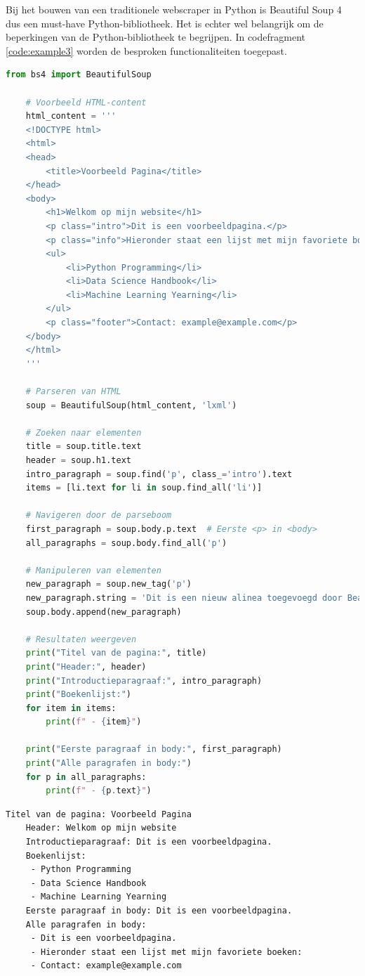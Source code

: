 Bij het bouwen van een traditionele webscraper  in Python is Beautiful Soup 4 dus een must-have Python-bibliotheek. Het is echter wel belangrijk om de beperkingen van de Python-bibliotheek te begrijpen. In codefragment \ref{code:example3} worden de besproken functionaliteiten toegepast.


\begin{lstlisting}[language=python, captionpos=b, caption=Een voorbeeld van de kernfunctionaliteiten van Beautiful Soup 4, label={code:example3}]
    from bs4 import BeautifulSoup

    # Voorbeeld HTML-content
    html_content = '''
    <!DOCTYPE html>
    <html>
    <head>
        <title>Voorbeeld Pagina</title>
    </head>
    <body>
        <h1>Welkom op mijn website</h1>
        <p class="intro">Dit is een voorbeeldpagina.</p>
        <p class="info">Hieronder staat een lijst met mijn favoriete boeken:</p>
        <ul>
            <li>Python Programming</li>
            <li>Data Science Handbook</li>
            <li>Machine Learning Yearning</li>
        </ul>
        <p class="footer">Contact: example@example.com</p>
    </body>
    </html>
    '''

    # Parseren van HTML
    soup = BeautifulSoup(html_content, 'lxml')

    # Zoeken naar elementen
    title = soup.title.text
    header = soup.h1.text
    intro_paragraph = soup.find('p', class_='intro').text
    items = [li.text for li in soup.find_all('li')]

    # Navigeren door de parseboom
    first_paragraph = soup.body.p.text  # Eerste <p> in <body>
    all_paragraphs = soup.body.find_all('p')

    # Manipuleren van elementen
    new_paragraph = soup.new_tag('p')
    new_paragraph.string = 'Dit is een nieuw alinea toegevoegd door Beautiful Soup.'
    soup.body.append(new_paragraph)

    # Resultaten weergeven
    print("Titel van de pagina:", title)
    print("Header:", header)
    print("Introductieparagraaf:", intro_paragraph)
    print("Boekenlijst:")
    for item in items:
        print(f" - {item}")

    print("Eerste paragraaf in body:", first_paragraph)
    print("Alle paragrafen in body:")
    for p in all_paragraphs:
        print(f" - {p.text}")
\end{lstlisting}

\begin{lstlisting}[caption={De output van code fragment \ref{code:example3}}, label={outuput:example1}]
    Titel van de pagina: Voorbeeld Pagina
    Header: Welkom op mijn website
    Introductieparagraaf: Dit is een voorbeeldpagina.
    Boekenlijst:
     - Python Programming
     - Data Science Handbook
     - Machine Learning Yearning
    Eerste paragraaf in body: Dit is een voorbeeldpagina.
    Alle paragrafen in body:
     - Dit is een voorbeeldpagina.
     - Hieronder staat een lijst met mijn favoriete boeken:
     - Contact: example@example.com
\end{lstlisting}


